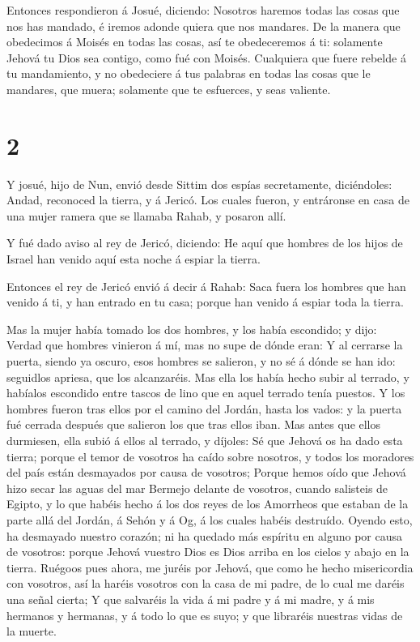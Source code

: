  Entonces respondieron á Josué, diciendo: Nosotros haremos
todas las cosas que nos has mandado, é iremos adonde quiera que nos
mandares.  De la manera que obedecimos á Moisés en todas
las cosas, así te obedeceremos á ti: solamente Jehová tu Dios sea
contigo, como fué con Moisés.  Cualquiera que fuere rebelde
á tu mandamiento, y no obedeciere á tus palabras en todas las cosas que
le mandares, que muera; solamente que te esfuerces, y seas valiente.

\hypertarget{section-1}{%
\section{2}\label{section-1}}

 Y josué, hijo de Nun, envió desde Sittim dos espías
secretamente, diciéndoles: Andad, reconoced la tierra, y á Jericó. Los
cuales fueron, y entráronse en casa de una mujer ramera que se llamaba
Rahab, y posaron allí.

 Y fué dado aviso al rey de Jericó, diciendo: He aquí que
hombres de los hijos de Israel han venido aquí esta noche á espiar la
tierra.

 Entonces el rey de Jericó envió á decir á Rahab: Saca fuera
los hombres que han venido á ti, y han entrado en tu casa; porque han
venido á espiar toda la tierra.

 Mas la mujer había tomado los dos hombres, y los había
escondido; y dijo: Verdad que hombres vinieron á mí, mas no supe de
dónde eran:  Y al cerrarse la puerta, siendo ya oscuro, esos
hombres se salieron, y no sé á dónde se han ido: seguidlos apriesa, que
los alcanzaréis.  Mas ella los había hecho subir al terrado,
y habíalos escondido entre tascos de lino que en aquel terrado tenía
puestos.  Y los hombres fueron tras ellos por el camino del
Jordán, hasta los vados: y la puerta fué cerrada después que salieron
los que tras ellos iban.  Mas antes que ellos durmiesen,
ella subió á ellos al terrado, y díjoles:  Sé que Jehová os
ha dado esta tierra; porque el temor de vosotros ha caído sobre
nosotros, y todos los moradores del país están desmayados por causa de
vosotros;  Porque hemos oído que Jehová hizo secar las
aguas del mar Bermejo delante de vosotros, cuando salisteis de Egipto, y
lo que habéis hecho á los dos reyes de los Amorrheos que estaban de la
parte allá del Jordán, á Sehón y á Og, á los cuales habéis destruído.
 Oyendo esto, ha desmayado nuestro corazón; ni ha quedado
más espíritu en alguno por causa de vosotros: porque Jehová vuestro Dios
es Dios arriba en los cielos y abajo en la tierra.  Ruégoos
pues ahora, me juréis por Jehová, que como he hecho misericordia con
vosotros, así la haréis vosotros con la casa de mi padre, de lo cual me
daréis una señal cierta;  Y que salvaréis la vida á mi
padre y á mi madre, y á mis hermanos y hermanas, y á todo lo que es
suyo; y que libraréis nuestras vidas de la muerte.

